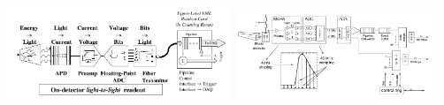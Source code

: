 \begin{center}
\centering
\mbox{
\includegraphics[height=0.5\textwidth, width=0.50\textwidth]{THESISPLOTS/CMS-ECAL-READOUT-CHAIN.png} \quad
\includegraphics[height=0.5\textwidth, width=0.450\textwidth]{THESISPLOTS/ReadOut.png}
} 
\label{fig:readout}
\end{center}
